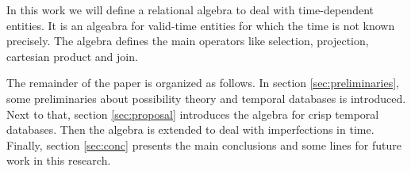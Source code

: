 In this work we will define a relational algebra to deal with time-dependent entities. It is an algeabra for valid-time entities for which the time is not known precisely. The algebra defines the main operators like selection, projection, cartesian product and join.


The remainder of the paper is organized as follows. In section \ref{sec:preliminaries}, some preliminaries about possibility theory and temporal databases is introduced. Next to that, section \ref{sec:proposal} introduces the algebra for crisp temporal databases. Then the algebra is extended to deal with imperfections in time. Finally, section \ref{sec:conc} presents the main conclusions and some lines for future work in this research.







% 




